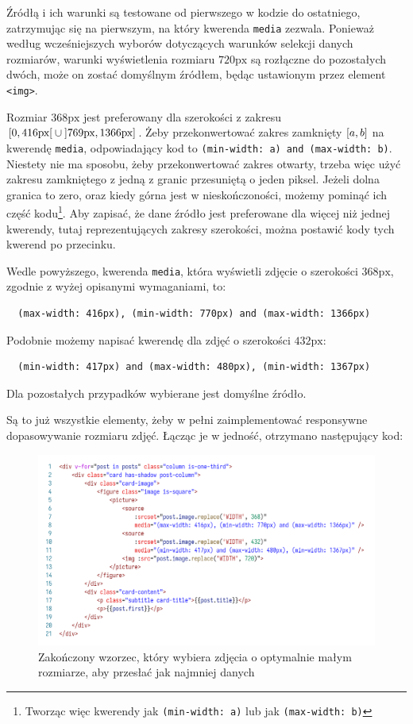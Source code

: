 \documentclass[licencjacka]{pracadypl}
\newcommand{\selfnote}[1]{\colorbox{pink}{#1}}
\begin{document}
Źródłą i ich warunki są testowane od pierwszego w kodzie do ostatniego, zatrzymując się na pierwszym, na który kwerenda \texttt{media} zezwala.
Ponieważ według wcześniejszych wyborów dotyczących warunków selekcji danych rozmiarów, warunki wyświetlenia rozmiaru $720\text{px}$ są rozłączne do pozostałych dwóch, może on zostać domyślnym źródłem, będąc ustawionym przez element \texttt{<img>}.  


Rozmiar $368\text{px}$ jest preferowany dla szerokości z zakresu $\rinterval{0}{416\text{px}} \cup \linterval{769\text{px}}{1366\text{px}}$. Żeby przekonwertować zakres zamknięty $\interval{a}{b}$ na kwerendę \texttt{media}, odpowiadający kod to \texttt{(min-width: a) and (max-width: b)}. Niestety nie ma sposobu, żeby przekonwertować zakres otwarty, trzeba więc użyć zakresu zamkniętego z jedną z granic przesuniętą o jeden piksel. Jeżeli dolna granica to zero, oraz kiedy górna jest w nieskończoności, możemy pominąć ich część kodu\footnote{Tworząc więc kwerendy jak \texttt{(min-width: a)} lub jak \texttt{(max-width: b)}}. Aby zapisać, że dane źródło jest preferowane dla więcej niż jednej kwerendy, tutaj reprezentujących zakresy szerokości, można postawić kody tych kwerend po przecinku.

Wedle powyższego, kwerenda \texttt{media}, która wyświetli zdjęcie o szerokości $368\text{px}$, zgodnie z wyżej opisanymi wymaganiami, to:
\begin{verbatim}
  (max-width: 416px), (min-width: 770px) and (max-width: 1366px)
\end{verbatim}
Podobnie możemy napisać kwerendę dla zdjęć o szerokości $432\text{px}$:
\begin{verbatim}
  (min-width: 417px) and (max-width: 480px), (min-width: 1367px)
\end{verbatim}
Dla pozostałych przypadków wybierane jest domyślne źródło. 

Są to już wszystkie elementy, żeby w pełni zaimplementować responsywne dopasowywanie rozmiaru zdjęć. Łącząc je w jedność, otrzymano następujący kod:

\begin{figure}[H]
  \includegraphics[width=\linewidth]{images/code-vue-image-card-done.png}
  \caption{Zakończony wzorzec, który wybiera zdjęcia o optymalnie małym rozmiarze, aby przesłać jak najmniej danych}
  \label{fig:code-vue-template-articles-done}
\end{figure}
\end{document}
